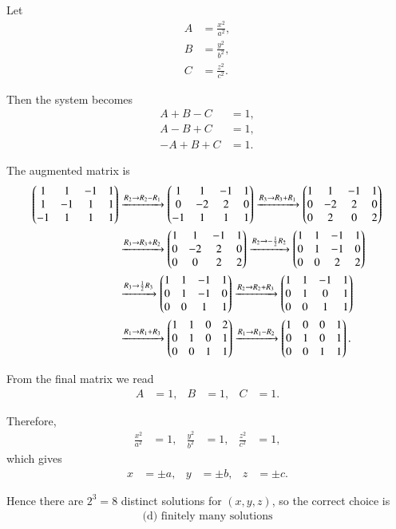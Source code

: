 \documentclass[journal]{IEEEtran}
\begin{document}
\begin{solution}
Let
\begin{align}
A &= \frac{x^2}{a^2}, \\
B &= \frac{y^2}{b^2}, \\
C &= \frac{z^2}{c^2}.
\end{align}

Then the system becomes
\begin{align}
A + B - C &= 1, \\
A - B + C &= 1, \\
- A + B + C &= 1.
\end{align}

The augmented matrix is
\begin{align}
\begin{pmatrix}1 & 1 & -1 & 1 \\ 1 & -1 & 1 & 1 \\ -1 & 1 & 1 & 1\end{pmatrix}
&\xrightarrow{R_2 \to R_2 - R_1}
\begin{pmatrix}1 & 1 & -1 & 1 \\ 0 & -2 & 2 & 0 \\ -1 & 1 & 1 & 1\end{pmatrix} 
\xrightarrow{R_3 \to R_3 + R_1}
\begin{pmatrix}1 & 1 & -1 & 1 \\ 0 & -2 & 2 & 0 \\ 0 & 2 & 0 & 2\end{pmatrix} \notag\\
&\xrightarrow{R_3 \to R_3 + R_2}
\begin{pmatrix}1 & 1 & -1 & 1 \\ 0 & -2 & 2 & 0 \\ 0 & 0 & 2 & 2\end{pmatrix} 
\xrightarrow{R_2 \to -\frac{1}{2} R_2} 
\begin{pmatrix}1 & 1 & -1 & 1 \\ 0 & 1 & -1 & 0 \\ 0 & 0 & 2 & 2\end{pmatrix} \notag\\
&\xrightarrow{R_3 \to \frac{1}{2} R_3} 
\begin{pmatrix}1 & 1 & -1 & 1 \\ 0 & 1 & -1 & 0 \\ 0 & 0 & 1 & 1\end{pmatrix} 
\xrightarrow{R_2 \to R_2 + R_3} 
\begin{pmatrix}1 & 1 & -1 & 1 \\ 0 & 1 & 0 & 1 \\ 0 & 0 & 1 & 1\end{pmatrix} \notag\\
&\xrightarrow{R_1 \to R_1 + R_3} 
\begin{pmatrix}1 & 1 & 0 & 2 \\ 0 & 1 & 0 & 1 \\ 0 & 0 & 1 & 1\end{pmatrix} 
\xrightarrow{R_1 \to R_1 - R_2} 
\begin{pmatrix}1 & 0 & 0 & 1 \\ 0 & 1 & 0 & 1 \\ 0 & 0 & 1 & 1\end{pmatrix}.
\end{align}

From the final matrix we read
\begin{align}
A &= 1, & B &= 1, & C &= 1.
\end{align}

Therefore,
\begin{align}
\frac{x^2}{a^2} &= 1, & \frac{y^2}{b^2} &= 1, & \frac{z^2}{c^2} &= 1,
\end{align}
which gives
\begin{align}
x &= \pm a, & y &= \pm b, & z &= \pm c.
\end{align}

Hence there are $2^3=8$ distinct solutions for $(x,y,z)$, so the correct choice is
\begin{align}
\boxed{\text{(d) finitely many solutions}}
\end{align}
\end{solution}
\end{document}

